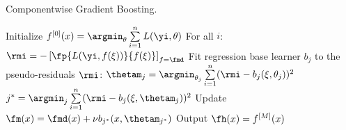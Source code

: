 
\begin{algorithm}[H]
  \begin{footnotesize}
  \begin{center}
  \caption{Componentwise Gradient Boosting.}
    \begin{algorithmic}[1]
      \State Initialize $f^{[0]}(x) = \argmin_{\theta} \sum  \limits_{i=1}^n L(\yi, \theta)$
        \State For all $i$: $\rmi = -\left[\fp{L(\yi, f(\xi))}{f(\xi)}\right]_{f=\fmd}$
          \State Fit regression base learner $b_j$ to the pseudo-residuals $\rmi$:
          \State $\thetam_j = \argmin_{\theta_j} \sum  \limits_{i=1}^n (\rmi - b_j(\xi, \theta_j))^2$
        \EndFor
        \State $j^* = \argmin_{j} \sum  \limits_{i=1}^n (\rmi - b_j(\xi, \thetam_j))^2$
        \State Update $\fm(x) = \fmd(x) + \nu b_{j^*}(x, \thetam_{j^*})$
      \EndFor
      \State Output $\fh(x) = f^{[M]}(x)$
    \end{algorithmic}
    \end{center}
    \end{footnotesize}
\end{algorithm}
